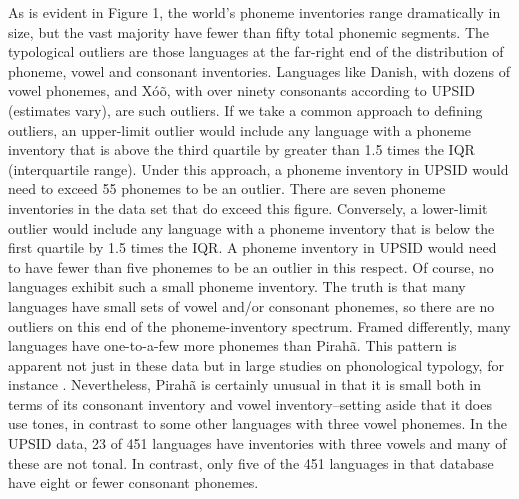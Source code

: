\documentclass[output=paper,colorlinks,citecolor=brown
]{langscibook}
\begin{document}
    As is evident in Figure 1, the world’s phoneme inventories range dramatically in size, but the vast majority have fewer than fifty total phonemic segments. The typological outliers are those languages at the far-right end of the distribution of phoneme, vowel and consonant inventories. Languages like Danish, with dozens of vowel phonemes, and Xóõ, with over ninety consonants according to UPSID (estimates vary), are such outliers. If we take a common approach to defining outliers, an upper-limit outlier would include any language with a phoneme inventory that is above the third quartile by greater than 1.5 times the IQR (interquartile range). Under this approach, a phoneme inventory in UPSID would need to exceed 55 phonemes to be an outlier. There are seven phoneme inventories in the data set that do exceed this figure. Conversely, a lower-limit outlier would include any language with a phoneme inventory that is below the first quartile by 1.5 times the IQR. A phoneme inventory in UPSID would need to have fewer than five phonemes to be an outlier in this respect. Of course, no languages exhibit such a small phoneme inventory. The truth is that many languages have small sets of vowel and/or consonant phonemes, so there are no outliers on this end of the phoneme-inventory spectrum. Framed differently, many languages have one-to-a-few more phonemes than Pirahã. This pattern is apparent not just in these data but in large studies on phonological typology, for instance . Nevertheless, Pirahã is certainly unusual in that it is small both in terms of its consonant inventory and vowel inventory–setting aside that it does use tones, in contrast to some other languages with three vowel phonemes. In the UPSID data, 23 of 451 languages have inventories with three vowels and many of these are not tonal. In contrast, only five of the 451 languages in that database have eight or fewer consonant phonemes. 
    
\end{document}
